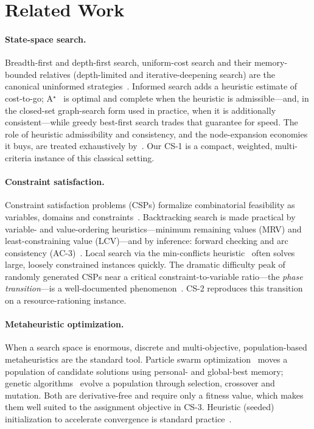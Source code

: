 \documentclass[10pt]{article}
\let\akparagraph\paragraph
\renewcommand{\paragraph}[1]{\Needspace*{4\baselineskip}\akparagraph{#1}}
\begin{document}
\section{Related Work}
\paragraph{State-space search.}
Breadth-first and depth-first search, uniform-cost search and their
memory-bounded relatives (depth-limited and iterative-deepening search) are the
canonical uninformed strategies~\cite{russell2020}. Informed search adds a
heuristic estimate of cost-to-go; A$^\star$~\cite{hart1968} is optimal and
complete when the heuristic is admissible---and, in the closed-set graph-search
form used in practice, when it is additionally consistent---while greedy
best-first search trades that guarantee for speed. The role of heuristic admissibility and consistency,
and the node-expansion economies it buys, are treated exhaustively
by~\cite{pearl1984}. Our CS-1 is a compact, weighted, multi-criteria instance
of this classical setting.

\paragraph{Constraint satisfaction.}
Constraint satisfaction problems (CSPs) formalize combinatorial feasibility as
variables, domains and constraints~\cite{dechter2003}. Backtracking search is
made practical by variable- and value-ordering heuristics---minimum remaining
values (MRV) and least-constraining value (LCV)---and by inference: forward
checking and arc consistency (AC-3)~\cite{mackworth1977}. Local search via the
min-conflicts heuristic~\cite{minton1992} often solves large, loosely
constrained instances quickly. The dramatic difficulty peak of randomly
generated CSPs near a critical constraint-to-variable ratio---the
\emph{phase transition}---is a well-documented phenomenon~\cite{cheeseman1991}.
CS-2 reproduces this transition on a resource-rationing instance.

\paragraph{Metaheuristic optimization.}
When a search space is enormous, discrete and multi-objective, population-based
metaheuristics are the standard tool. Particle swarm
optimization~\cite{kennedy1995} moves a population of candidate solutions using
personal- and global-best memory; genetic algorithms~\cite{holland1975,
goldberg1989} evolve a population through selection, crossover and mutation.
Both are derivative-free and require only a fitness value, which makes them well
suited to the assignment objective in CS-3. Heuristic (seeded) initialization to
accelerate convergence is standard practice~\cite{goldberg1989}.
\end{document}
